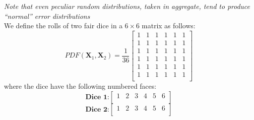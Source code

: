 \documentclass[12pt,letterpaper, onecolumn]{exam}
\begin{document}
\begin{questions}
        \textit{Note that even peculiar random distributions, taken in aggregate, tend to produce
        “normal” error distributions}
\clearpage    
    \\
    \solution
        We define the rolls of two fair dice in a $6 \times 6$ matrix as follows:
        \begin{equation}
            PDF(\mathbf{X}_1, \mathbf{X}_2) = 
            \frac{1}{36}
            \begin{bmatrix}
              1 & 1 & 1 & 1 & 1 & 1\\
              1 & 1 & 1 & 1 & 1 & 1\\
              1 & 1 & 1 & 1 & 1 & 1\\
              1 & 1 & 1 & 1 & 1 & 1\\
              1 & 1 & 1 & 1 & 1 & 1\\
              1 & 1 & 1 & 1 & 1 & 1\\
            \end{bmatrix}
        \end{equation}
        where the dice have the following numbered faces:
        \[\textbf{Dice 1:} 
            \begin{bmatrix}
                1 & 2 & 3 & 4 & 5 & 6\\
            \end{bmatrix} \]
        \[\textbf{Dice 2:} 
            \begin{bmatrix}
                1 & 2 & 3 & 4 & 5 & 6\\
            \end{bmatrix} \]
        \begin{parts}

\end{parts}
\end{questions}
\end{document}
